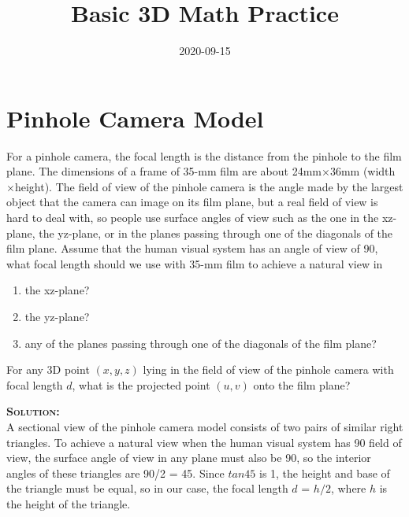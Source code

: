 \documentclass[11pt]{article}  %
\title{Basic 3D Math Practice}
\author{\href{mailto:neo-mashiro@hotmail.com}{\color{purple}{Wentao Lu}}}
\date{2020-09-15}
\begin{document}
    \newcommand{\solution}{\noindent \textbf{\textsc{Solution:}} \dotfill \vspace{2mm}}  %

    \maketitle

\section{Pinhole Camera Model}
    For a pinhole camera, the focal length is the distance from the pinhole to the film plane. The dimensions of a frame of 35-mm film are about 24mm$\times$36mm (width$\times$height). The field of view of the pinhole camera is the angle made by the largest object that the camera can image on its film plane, but a real field of view is hard to deal with, so people use surface angles of view such as the one in the xz-plane, the yz-plane, or in the planes passing through one of the diagonals of the film plane. Assume that the human visual system has an angle of view of 90\textdegree, what focal length should we use with 35-mm film to achieve a natural view in
    \begin{enumerate}[itemsep=0mm]
        \item the xz-plane?
        \item the yz-plane?
        \item any of the planes passing through one of the diagonals of the film plane?
    \end{enumerate}
    For any 3D point $(x,y,z)$ lying in the field of view of the pinhole camera with focal length $d$, what is the projected point $(u,v)$ onto the film plane?\vspace{3mm}

\solution\\
    A sectional view of the pinhole camera model consists of two pairs of similar right triangles. To achieve a natural view when the human visual system has 90\textdegree\hspace{0pt} field of view, the surface angle of view in any plane must also be 90\textdegree, so the interior angles of these triangles are 90/2 = 45\textdegree. Since $tan45$ is 1, the height and base of the triangle must be equal, so in our case, the focal length $d$ = $h/2$, where $h$ is the height of the triangle.\\
\end{document}
